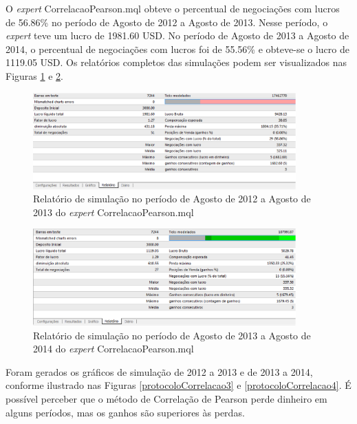 O \textit{expert} CorrelacaoPearson.mql obteve o percentual de negociações com lucros de 56.86\% no período de Agosto de 2012 a Agosto de 2013. Nesse período, o \textit{expert} teve um lucro de 1981.60 USD. No período de Agosto de 2013 a Agosto de 2014, o percentual de negociações com lucros foi de 55.56\%  e obteve-se o lucro de 1119.05 USD. 
Os relatórios completos das simulações podem ser visualizados nas Figuras \ref{protocoloCorrelacao} e \ref{protocoloCorrelacao2}.

\begin{figure}[H]
\centering
\includegraphics[width=0.9\textwidth]{figuras/protocoloCorrelacao}
\caption{Relatório de simulação no período de Agosto de 2012 a Agosto de 2013 do \textit{expert} CorrelacaoPearson.mql}
\label{protocoloCorrelacao}
\end{figure}

\begin{figure}[H]
\centering

\includegraphics[width=0.9\textwidth]{figuras/protocoloCorrelacao2}
\caption{Relatório de simulação no período de Agosto de 2013 a Agosto de 2014 do \textit{expert} CorrelacaoPearson.mql}
\label{protocoloCorrelacao2}
\end{figure}

Foram gerados os gráficos de simulação de 2012 a 2013 e de 2013 a 2014, conforme ilustrado nas Figuras \ref{protocoloCorrelacao3} e \ref{protocoloCorrelacao4}. É possível perceber que o método de Correlação de Pearson perde dinheiro em alguns períodos, mas os ganhos são superiores às perdas.

